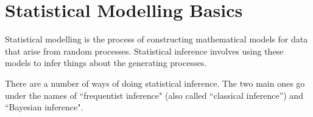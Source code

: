 
\section{Statistical Modelling Basics}

Statistical modelling is the process of constructing mathematical models for data that arise from random processes. Statistical inference involves using these models to infer things about the generating processes. 



There are a number of ways of doing statistical inference. The two main ones go under the names of ``frequentist inference" (also called ``classical inference'') and ``Bayesian inference". %

